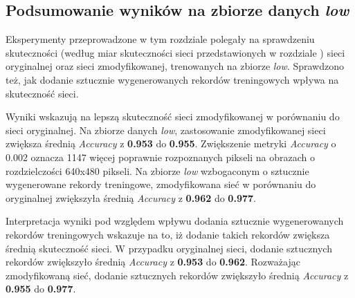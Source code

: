 \subsection{Podsumowanie wyników na zbiorze danych \textit{low}}
Eksperymenty przeprowadzone w tym rozdziale polegały na sprawdzeniu skuteczności (według miar skuteczności sieci przedstawionych w rozdziale ) sieci oryginalnej oraz sieci zmodyfikowanej, trenowanych na zbiorze \textit{low}.
Sprawdzono też, jak dodanie sztucznie wygenerowanych rekordów treningowych wpływa na skuteczność sieci.


Wyniki wskazują na lepszą skuteczność sieci zmodyfikowanej w porównaniu do sieci oryginalnej.
Na zbiorze danych \textit{low}, zastosowanie zmodyfikowanej sieci zwiększa średnią \textit{Accuracy} z \textbf{0.953} do \textbf{0.955}.
Zwiększenie metryki \textit{Accuracy} o 0.002 oznacza 1147 więcej poprawnie rozpoznanych pikseli na obrazach o rozdzielczości 640x480 pikseli. Na zbiorze \textit{low} wzbogaconym o sztucznie wygenerowane rekordy treningowe, zmodyfikowana sieć w porównaniu do oryginalnej zwiększyła średnią \textit{Accuracy} z \textbf{0.962} do \textbf{0.977}.


Interpretacja wyniki pod względem wpływu dodania sztucznie wygenerowanych rekordów treningowych wskazuje na to, iż dodanie takich rekordów zwiększa średnią skuteczność sieci. W przypadku oryginalnej sieci, dodanie sztucznych rekordów zwiększyło średnią \textit{Accuracy} z \textbf{0.953} do \textbf{0.962}. Rozważając zmodyfikowaną sieć, dodanie sztucznych rekordów zwiększyło średnią \textit{Accuracy} z \textbf{0.955} do \textbf{0.977}.

